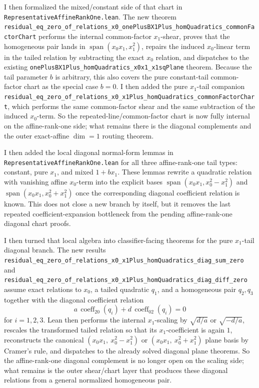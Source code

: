 \documentclass[11pt]{article}
\begin{document}
I then formalized the mixed/constant side of that chart in
\texttt{RepresentativeAffineRankOne.lean}. The new theorem
\texttt{residual\_eq\_zero\_of\_relations\_x0\_onePlusBX1Plus\_homQuadratics\_commonFactorChart}
performs the internal common-factor \(x_1\)-shear, proves that the homogeneous
pair lands in \(\operatorname{span}(x_0x_1,x_1^2)\), repairs the induced
\(x_0\)-linear term in the tailed relation by subtracting the exact \(x_0\)
relation, and dispatches to the existing
\texttt{onePlusBX1Plus\_homQuadratics\_x0x1\_x1sqPlane} theorem. Because the
tail parameter \(b\) is arbitrary, this also covers the pure constant-tail
common-factor chart as the special case \(b=0\). I then added the pure
\(x_1\)-tail companion
\texttt{residual\_eq\_zero\_of\_relations\_x0\_x1Plus\_homQuadratics\_commonFactorChart},
which performs the same common-factor shear and the same subtraction of the
induced \(x_0\)-term. So the repeated-line/common-factor chart is now fully
internal on the affine-rank-one side; what remains there is the diagonal
complements and the outer exact-affine \(\dim=1\) routing theorem.

I then added the local diagonal normal-form lemmas in
\texttt{RepresentativeAffineRankOne.lean} for all three affine-rank-one tail
types: constant, pure \(x_1\), and mixed \(1+b x_1\). These lemmas rewrite a
quadratic relation with vanishing affine \(x_0\)-term into the explicit bases
\(\operatorname{span}(x_0x_1,x_0^2-x_1^2)\) and
\(\operatorname{span}(x_0x_1,x_0^2+x_1^2)\) once the corresponding diagonal
coefficient relation is known. This does not close a new branch by itself, but
it removes the last repeated coefficient-expansion bottleneck from the pending
affine-rank-one diagonal chart proofs.

I then turned that local algebra into classifier-facing theorems for the pure
\(x_1\)-tail diagonal branch. The new results
\texttt{residual\_eq\_zero\_of\_relations\_x0\_x1Plus\_homQuadratics\_diag\_sum\_zero}
and
\texttt{residual\_eq\_zero\_of\_relations\_x0\_x1Plus\_homQuadratics\_diag\_diff\_zero}
assume exact relations to \(x_0\), a tailed quadratic \(q_1\), and a
homogeneous pair \(q_2,q_3\) together with the diagonal coefficient relation
\[
  a\,\operatorname{coeff}_{20}(q_i) + d\,\operatorname{coeff}_{02}(q_i)=0
\]
for \(i=1,2,3\). Lean then performs the internal \(x_1\)-scaling by
\(\sqrt{d/a}\) or \(\sqrt{-d/a}\), rescales the transformed tailed relation so
that its \(x_1\)-coefficient is again \(1\), reconstructs the canonical
\((x_0x_1,\ x_0^2-x_1^2)\) or \((x_0x_1,\ x_0^2+x_1^2)\) plane basis by
Cramer's rule, and dispatches to the already solved diagonal plane theorems.
So the affine-rank-one diagonal complement is no longer open on the scaling
side; what remains is the outer shear/chart layer that produces these diagonal
relations from a general normalized homogeneous pair.
\end{document}
